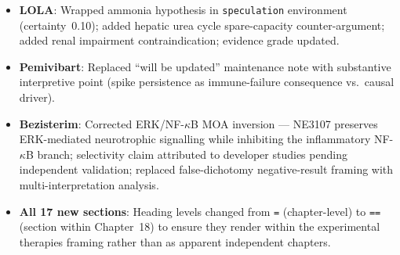 \begin{itemize}
\begin{itemize}
        separate trial.
      \item \textbf{LOLA}: Wrapped ammonia hypothesis in \texttt{speculation} environment (certainty~0.10);
        added hepatic urea cycle spare-capacity counter-argument; added renal impairment
        contraindication; evidence grade updated.
      \item \textbf{Pemivibart}: Replaced ``will be updated'' maintenance note with substantive
        interpretive point (spike persistence as immune-failure consequence vs.\ causal driver).
      \item \textbf{Bezisterim}: Corrected ERK/NF-$\kappa$B MOA inversion --- NE3107 preserves
        ERK-mediated neurotrophic signalling while inhibiting the inflammatory NF-$\kappa$B
        branch; selectivity claim attributed to developer studies pending independent validation;
        replaced false-dichotomy negative-result framing with multi-interpretation analysis.
      \item \textbf{All 17 new sections}: Heading levels changed from \texttt{=} (chapter-level) to
        \texttt{==} (section within Chapter~18) to ensure they render within the experimental
        therapies framing rather than as apparent independent chapters.
    \end{itemize}


\end{itemize}
